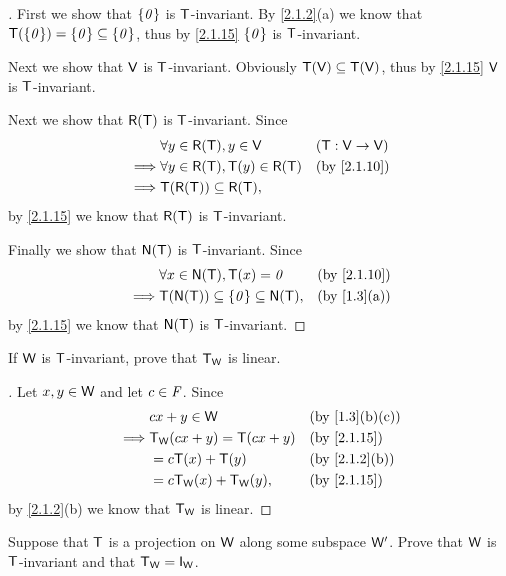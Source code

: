 \begin{proof}[]
	First we show that \(\left\lbrace\mathit{0}\right\rbrace\) is \(\mathsf{T}\)-invariant.
	By \cref{2.1.2}(a) we know that \(\mathsf{T}(\left\lbrace\mathit{0}\right\rbrace) = \left\lbrace\mathit{0}\right\rbrace \subseteq \left\lbrace\mathit{0}\right\rbrace\), thus by \cref{2.1.15} \(\left\lbrace\mathit{0}\right\rbrace\) is \(\mathsf{T}\)-invariant.

	Next we show that \(\mathsf{V}\) is \(\mathsf{T}\)-invariant.
	Obviously \(\mathsf{T}(\mathsf{V}) \subseteq \mathsf{T}(\mathsf{V})\), thus by \cref{2.1.15} \(\mathsf{V}\) is \(\mathsf{T}\)-invariant.

	Next we show that \(\rg{\T}\) is \(\mathsf{T}\)-invariant.
	Since
	\begin{align*}
		         & \forall y \in \rg{\T}, y \in \V          &  & (\T : \V \to \V) \\
		\implies & \forall y \in \rg{\T}, \T(y) \in \rg{\T} &  & \by{2.1.10}      \\
		\implies & \T(\rg{\T}) \subseteq \rg{\T},
	\end{align*}
	by \cref{2.1.15} we know that \(\rg{\T}\) is \(\mathsf{T}\)-invariant.

	Finally we show that \(\ns{\T}\) is \(\mathsf{T}\)-invariant.
	Since
	\begin{align*}
		         & \forall x \in \ns{\T}, \T(x) = \zv                 &  & \by{2.1.10} \\
		\implies & \T(\ns{\T}) \subseteq \set{\zv} \subseteq \ns{\T}, &  & \by{1.3}[a]
	\end{align*}
	by \cref{2.1.15} we know that \(\ns{\T}\) is \(\mathsf{T}\)-invariant.
\end{proof}

\begin{ex}\label{ex:2.1.29}
	If \(\mathsf{W}\) is \(\mathsf{T}\)-invariant, prove that \(\mathsf{T}_{\mathsf{W}}\) is linear.
\end{ex}

\begin{proof}[]
	Let \(x, y \in \mathsf{W}\) and let \(c \in \mathit{F}\).
	Since
	\begin{align*}
		         & cx + y \in \W                &  & \by{1.3}[b,c] \\
		\implies & \T_{\W}(cx + y) = \T(cx + y) &  & \by{2.1.15}   \\
		         & = c \T(x) + \T(y)            &  & \by{2.1.2}[b] \\
		         & = c \T_{\W}(x) + \T_{\W}(y), &  & \by{2.1.15}
	\end{align*}
	by \cref{2.1.2}(b) we know that \(\mathsf{T}_{\mathsf{W}}\) is linear.
\end{proof}

\begin{ex}\label{ex:2.1.30}
	Suppose that \(\mathsf{T}\) is a projection on \(\mathsf{W}\) along some subspace \(\mathsf{W}'\).
	Prove that \(\mathsf{W}\) is \(\mathsf{T}\)-invariant and that \(\T_{\W} = \IT[\W]\).
\end{ex}

